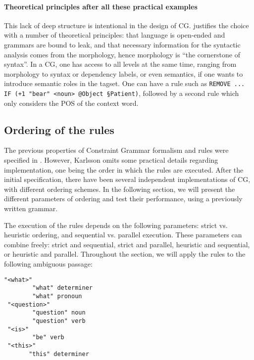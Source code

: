\paragraph{Theoretical principles after all these practical examples} This lack of deep structure is intentional in the design of CG.
\cite{karlsson1995constraint} justifies the choice with a number of
theoretical principles: that language is open-ended and grammars are
bound to leak, and that necessary information for the syntactic analysis
comes from the morphology, hence morphology is ``the cornerstone of
syntax''. In a CG, one has access to all levels at the same time,
ranging from morphology to syntax or dependency labels, or even
semantics, if one wants to introduce semantic roles in the
tagset. One can have a rule such as \texttt{REMOVE ... IF (+1 "bear" <noun>
  @Object §Patient)}, followed by a second rule which only considers the POS of the
context word.

\subsection*{Ordering of the rules}\label{ordering}

The previous properties of Constraint Grammar formalism and rules were specified in \cite{karlsson1995constraint}. However, Karlsson omits some practical details regarding implementation, one being the order in which the rules are executed. After the initial specification, there have been several independent implementations of CG, with different ordering schemes. In the following section, we will present the different parameters of ordering and test their performance, using a previously written grammar.

The execution of the rules depends on the following parameters: strict vs. heuristic ordering, and sequential vs. parallel execution. These parameters can combine freely: strict and sequential, strict and parallel, heuristic and sequential, or heuristic and parallel. Throughout the section, we will apply the rules to the following ambiguous passage:
\begin{verbatim}
"<what>"
        "what" determiner
        "what" pronoun                                        
 "<question>"
        "question" noun
        "question" verb
 "<is>"
        "be" verb
 "<this>"
       "this" determiner
\end{verbatim}


